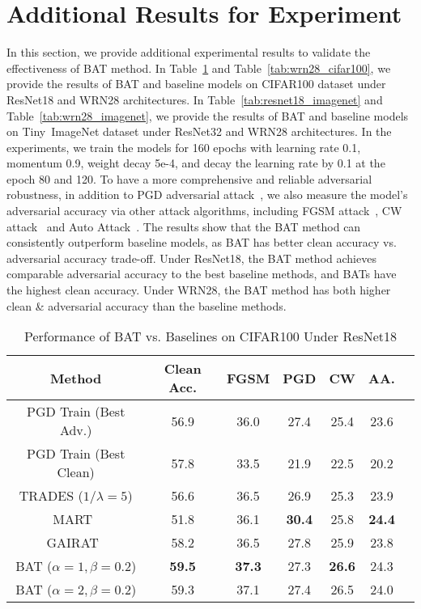 \section{Additional Results for Experiment}\label{app:exp}

In this section, we provide additional experimental results to validate the effectiveness of BAT method. In Table~\ref{tab:resnet18_cifar100} and Table~\ref{tab:wrn28_cifar100}, we provide the results of BAT and baseline models on CIFAR100 dataset under ResNet18 and WRN28 architectures. In Table~\ref{tab:resnet18_imagenet} and Table~\ref{tab:wrn28_imagenet}, we provide the results of BAT and baseline models on Tiny~ImageNet dataset under ResNet32 and WRN28 architectures. In the experiments, we train the models for 160 epochs with learning rate 0.1, momentum 0.9, weight decay 5e-4, and decay the learning rate by 0.1 at the epoch 80 and 120. To have a more comprehensive and reliable adversarial robustness, in addition to PGD adversarial attack~\cite{madry2017towards}, we also measure the model's adversarial accuracy via other attack algorithms, including FGSM attack~\cite{goodfellow2014explaining}, CW attack~\cite{carlini2017towards} and Auto Attack~\cite{croce2020reliable}. The results show that the BAT method can consistently outperform baseline models, as BAT has better clean accuracy vs. adversarial accuracy trade-off. Under ResNet18, the BAT method achieves comparable adversarial accuracy to the best baseline methods, and BATs have the highest clean accuracy. Under WRN28, the BAT method has both higher clean \& adversarial accuracy than the baseline methods.



\begin{table}[h]
\small
\centering
\caption{Performance of BAT vs. Baselines on CIFAR100 Under ResNet18}
\label{tab:resnet18_cifar100}
\begin{tabular}{c|c|ccccc}
\hline
Method & Clean Acc. & FGSM & PGD & CW & AA. \\
\hline
\hline
PGD Train (Best Adv.) & 56.9 & 36.0 & 27.4 & 25.4 & 23.6 \\
PGD Train (Best Clean) & 57.8 & 33.5 & 21.9 & 22.5 & 20.2 \\
TRADES ($1/\lambda = 5$) & 56.6 & 36.5 & 26.9 & 25.3 & 23.9 \\
MART~\cite{wang2019improving} & 51.8 & 36.1 & \textbf{30.4} & 25.8 & \textbf{24.4} \\
GAIRAT~\cite{zhang2020geometry} & 58.2 &36.5 & 27.8 & 25.9 & 23.8\\
\hline
BAT ($\alpha = 1, \beta = 0.2$) & \textbf{59.5} & \textbf{37.3} & 27.3 & \textbf{26.6} & 24.3\\
BAT ($\alpha = 2, \beta = 0.2$) &59.3 & 37.1 & 27.4 & 26.5 & 24.0\\
\hline
\hline
\end{tabular}
\end{table}

